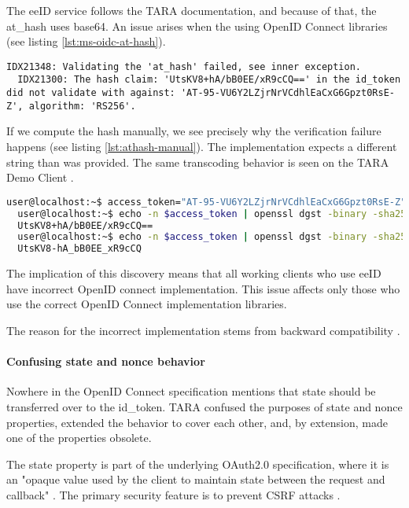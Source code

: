 The eeID service follows the TARA documentation, and because of that, the at\_hash uses base64. An issue arises when the using OpenID Connect libraries (see listing \ref{lst:ms-oidc-at-hash}).

\begin{lstlisting}[caption={Microsoft.IdentityModel.Protocols.OpenIdConnect fails to validate at\_hash}, label={lst:ms-oidc-at-hash}]
  IDX21348: Validating the 'at_hash' failed, see inner exception.
  IDX21300: The hash claim: 'UtsKV8+hA/bB0EE/xR9cCQ==' in the id_token did not validate with against: 'AT-95-VU6Y2LZjrNrVCdhlEaCxG6Gpzt0RsE-Z', algorithm: 'RS256'.
\end{lstlisting}

If we compute the hash manually, we see precisely why the verification failure happens (see listing \ref{lst:athash-manual}). The implementation expects a different string than was provided. The same transcoding behavior is seen on the TARA Demo Client \cite{tara-demorest}.

\begin{lstlisting}[caption={Verifying at\_hash manually}, label={lst:athash-manual}, language={bash}]
  user@localhost:~$ access_token="AT-95-VU6Y2LZjrNrVCdhlEaCxG6Gpzt0RsE-Z"
  user@localhost:~$ echo -n $access_token | openssl dgst -binary -sha256 | head -c 16 | base64
  UtsKV8+hA/bB0EE/xR9cCQ==
  user@localhost:~$ echo -n $access_token | openssl dgst -binary -sha256 | head -c 16 | base64 | tr '/+' '_-' | tr -d '='
  UtsKV8-hA_bB0EE_xR9cCQ
\end{lstlisting}

The implication of this discovery means that all working clients who use eeID have incorrect OpenID connect implementation. This issue affects only those who use the correct OpenID Connect implementation libraries.

The reason for the incorrect implementation stems from backward compatibility \cite{tara-non-oidc-compliant}.

\paragraph{Confusing state and nonce behavior}

Nowhere in the OpenID Connect specification mentions that state should be transferred over to the id\_token. TARA confused the purposes of state and nonce properties, extended the behavior to cover each other, and, by extension, made one of the properties obsolete.

The state property is part of the underlying OAuth2.0 specification, where it is an "opaque value used by the client to maintain state between the request and callback" \cite{rfc6749}. The primary security feature is to prevent CSRF attacks \cite{rfc6749,ietf-oauth-security-topics-19}.

